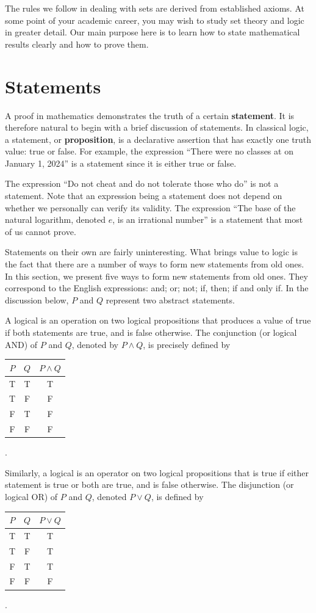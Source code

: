 The rules we follow in dealing with sets are derived from established axioms.
At some point of your academic career, you may wish to study set theory and logic in greater detail.
Our main purpose here is to learn how to state mathematical results clearly and how to prove them.


\section{Statements}

A proof in mathematics demonstrates the truth of a certain \textbf{statement}.
It is therefore natural to begin with a brief discussion of statements.
In classical logic, a statement, or \textbf{proposition}, is a declarative assertion that has exactly one truth value: true or false.
For example, the expression ``There were no classes at \univ on January 1, 2024'' is a statement since it is either true or false.

The expression ``Do not cheat and do not tolerate those who do'' is not a statement.
Note that an expression being a statement does not depend on whether we personally can verify its validity.
The expression ``The base of the natural logarithm, denoted $e$, is an irrational number'' is a statement that most of us cannot prove.

Statements on their own are fairly uninteresting.
What brings value to logic is the fact that there are a number of ways to form new statements from old ones.
In this section, we present five ways to form new statements from old ones.
They correspond to the English expressions: and; or; not; if, then; if and only if.
In the discussion below, $P$ and $Q$ represent two abstract statements.

A logical  is an operation on two logical propositions that produces a value of true if both statements are true, and is false otherwise.
The conjunction (or logical AND) of $P$ and $Q$, denoted by $P \wedge Q$, is precisely defined by
\begin{center}
\begin{tabular}{|c|c|c|}
\hline
$P$ & $Q$ & $P \wedge Q$ \tabularnewline
\hline
T & T & T \tabularnewline
T & F & F \tabularnewline
F & T & F \tabularnewline
F & F & F \tabularnewline
\hline
\end{tabular} .
\end{center}

Similarly, a logical  is an operator on two logical propositions that is true if either statement is true or both are true, and is false otherwise.
The disjunction (or logical OR) of $P$ and $Q$, denoted $P \vee Q$, is defined by
\begin{center}
\begin{tabular}{|c|c|c|}
\hline
$P$ & $Q$ & $P \vee Q$ \tabularnewline
\hline
T & T & T \tabularnewline
T & F & T \tabularnewline
F & T & T \tabularnewline
F & F & F \tabularnewline
\hline
\end{tabular} .
\end{center}

